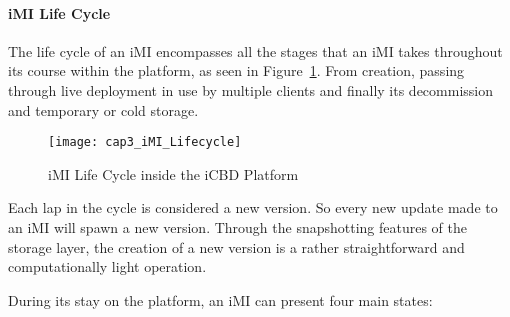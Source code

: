\paragraph{iMI Life Cycle}
\label{subsub:imi_lifecycle}
The life cycle of an iMI encompasses all the stages that an iMI takes throughout its course within the platform, as seen in Figure~\ref{fig:icbd_iMI_lifecycle}. From creation, passing through live deployment in use by multiple clients and finally its decommission and temporary or cold storage.

\begin{figure}[htbp]
	\centering
	\texttt{[image: cap3\_iMI\_Lifecycle]}
	\caption{iMI Life Cycle inside the iCBD Platform}
	\label{fig:icbd_iMI_lifecycle}
\end{figure}

Each lap in the cycle is considered a new version. So every new update made to an iMI will spawn a new version. Through the snapshotting features of the storage layer, the creation of a new version is a rather straightforward and computationally light operation.

During its stay on the platform, an iMI can present four main states:

